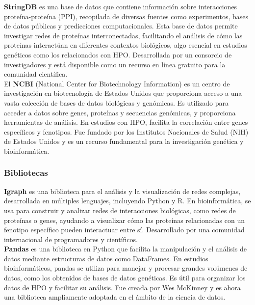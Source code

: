 \textbf{StringDB} es una base de datos que contiene información sobre interacciones proteína-proteína (PPI), recopilada de diversas fuentes como experimentos, bases de datos públicas y predicciones computacionales.
Esta base de datos permite investigar redes de proteínas interconectadas, facilitando el análisis de cómo las proteínas interactúan en diferentes contextos biológicos, algo esencial en estudios genéticos como los relacionados con HPO.
Desarrollada por un consorcio de investigadores y está disponible como un recurso en línea gratuito para la comunidad científica.\\

 

El \textbf{NCBI} (National Center for Biotechnology Information) es un centro de investigación en biotecnología de Estados Unidos que proporciona acceso a una vasta colección de bases de datos biológicas y genómicas.
Es utilizado para acceder a datos sobre genes, proteínas y secuencias genómicas, y proporciona herramientas de análisis. En estudios con HPO, facilita la correlación entre genes específicos y fenotipos.
Fue fundado por los Institutos Nacionales de Salud (NIH) de Estados Unidos y es un recurso fundamental para la investigación genética y bioinformática.



\subsubsection{Bibliotecas}




\textbf{Igraph} es una biblioteca para el análisis y la visualización de redes complejas, desarrollada en múltiples lenguajes, incluyendo Python y R.
En bioinformática, se usa para construir y analizar redes de interacciones biológicas, como redes de proteínas o genes, ayudando a visualizar cómo las proteínas relacionadas con un fenotipo específico pueden interactuar entre sí.
Desarrollado por una comunidad internacional de programadores y científicos.\\


\textbf{Pandas} es una biblioteca en Python que facilita la manipulación y el análisis de datos mediante estructuras de datos como DataFrames.
En estudios bioinformáticos, pandas se utiliza para manejar y procesar grandes volúmenes de datos, como los obtenidos de bases de datos genéticas. Es útil para organizar los datos de HPO y facilitar su análisis.
Fue creada por Wes McKinney y es ahora una biblioteca ampliamente adoptada en el ámbito de la ciencia de datos.\\


